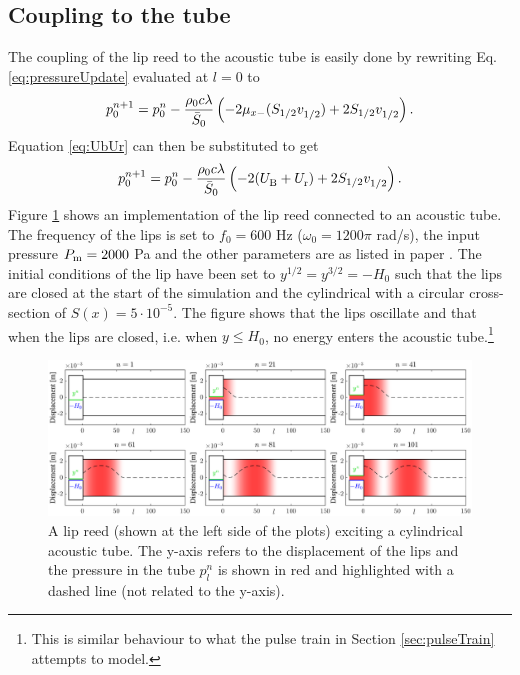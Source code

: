 \subsection{Coupling to the tube}\label{sec:lipreedTube}
The coupling of the lip reed to the acoustic tube is easily done by rewriting Eq. \eqref{eq:pressureUpdate} evaluated at $l=0$ to
\begin{equation}\label{eq:tubeCoupling}
    p^{n+1}_0 = p_0^n - \frac{\rho_0c\lambda}{\bar S_0}\left(-2\mu_{x-}(S_{1/2}v_{1/2}^{}) + 2 S_{1/2}v_{1/2}^{}\right).
\end{equation}
Equation \eqref{eq:UbUr} can then be substituted to get
\begin{equation}\label{eq:pressureCoupled}
    p^{n+1}_0 = p_0^n - \frac{\rho_0c\lambda}{\bar S_0}\left(-2(U_\text{B}^{} + U_\text{r}^{}) + 2 S_{1/2}v_{1/2}^{}\right).
\end{equation}
Figure \ref{fig:lipreedTube} shows an implementation of the lip reed connected to an acoustic tube. The frequency of the lips is set to $f_0 = 600$ Hz ($\omega_0 = 1200\pi$ rad/s), the input pressure $P_{\text{m}} = 2000$ Pa and the other parameters are as listed in paper \citeP[H]. The initial conditions of the lip have been set to $y^{1/2} = y^{3/2} = -H_0$ such that the lips are closed at the start of the simulation and the cylindrical with a circular cross-section of $S(x) = 5\cdot 10^{-5}$. The figure shows that the lips oscillate and that when the lips are closed, i.e. when $y \leq H_0$, no energy enters the acoustic tube.\footnote{This is similar behaviour to what the pulse train in Section \ref{sec:pulseTrain} attempts to model.}


\begin{figure}[h]
    \centering
    \includegraphics[width=\textwidth]{figures/exciters/lipreed/lipreedImplementation.eps}
    \caption{A lip reed (shown at the left side of the plots) exciting a cylindrical acoustic tube. The y-axis refers to the displacement of the lips and the pressure in the tube $p_l^n$ is shown in red and highlighted with a dashed line (not related to the y-axis).\label{fig:lipreedTube}}
\end{figure}
